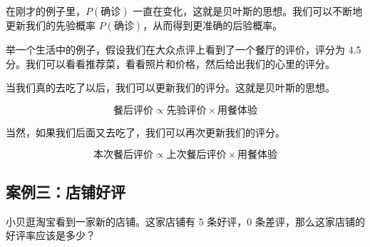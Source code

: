 \documentclass[UTF8]{ctexart}
\begin{document}
在刚才的例子里，$P(\text{确诊})$ 一直在变化，这就是贝叶斯的思想。我们可以不断地更新我们的先验概率 $P(\text{确诊})$，从而得到更准确的后验概率。

举一个生活中的例子，假设我们在大众点评上看到了一个餐厅的评价，评分为 4.5 分。我们可以看看推荐菜，看看照片和价格，然后给出我们的心里的评分。

当我们真的去吃了以后，我们可以更新我们的评分。这就是贝叶斯的思想。

\begin{equation}
	\text{餐后评价} \propto \text{先验评价} \times \text{用餐体验}
\end{equation}

当然，如果我们后面又去吃了，我们可以再次更新我们的评分。

\begin{equation}
	\text{本次餐后评价} \propto \text{上次餐后评价} \times \text{用餐体验}
\end{equation}

\subsection{案例三：店铺好评}

\begin{Exercise}
	小贝逛淘宝看到一家新的店铺。这家店铺有 5 条好评，0 条差评，那么这家店铺的好评率应该是多少？
\end{Exercise}
\end{document}
